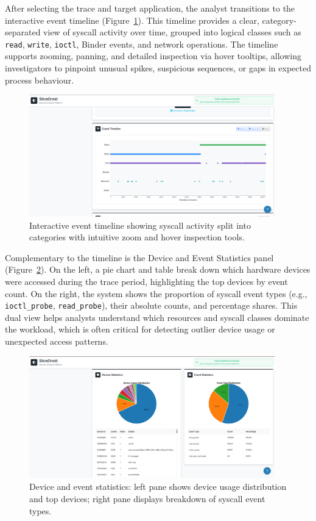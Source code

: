 \documentclass[a4paper,12pt]{report}
\begin{document}
After selecting the trace and target application, the analyst transitions to the interactive event timeline (Figure~\ref{fig:event_timeline}). This timeline provides a clear, category-separated view of syscall activity over time, grouped into logical classes such as \texttt{read}, \texttt{write}, \texttt{ioctl}, Binder events, and network operations. The timeline supports zooming, panning, and detailed inspection via hover tooltips, allowing investigators to pinpoint unusual spikes, suspicious sequences, or gaps in expected process behaviour.

\begin{figure}[H]
\centering
\includegraphics[width=0.95\textwidth]{system_events_timeline.png}
\caption{Interactive event timeline showing syscall activity split into categories with intuitive zoom and hover inspection tools.}
\label{fig:event_timeline}
\end{figure}

Complementary to the timeline is the Device and Event Statistics panel (Figure~\ref{fig:device_event_statistics}). On the left, a pie chart and table break down which hardware devices were accessed during the trace period, highlighting the top devices by event count. On the right, the system shows the proportion of syscall event types (e.g., \texttt{ioctl\_probe}, \texttt{read\_probe}), their absolute counts, and percentage shares. This dual view helps analysts understand which resources and syscall classes dominate the workload, which is often critical for detecting outlier device usage or unexpected access patterns.

\begin{figure}[H]
\centering
\includegraphics[width=0.95\textwidth]{device_event_statistics.png}
\caption{Device and event statistics: left pane shows device usage distribution and top devices; right pane displays breakdown of syscall event types.}
\label{fig:device_event_statistics}
\end{figure}
\end{document}
